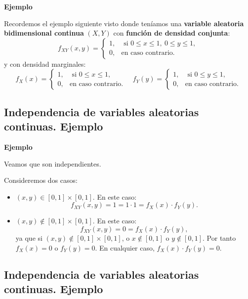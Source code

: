 \documentclass[]{book}
\begin{document}
\textbf{Ejemplo}

Recordemos el ejemplo siguiente visto donde teníamos una \textbf{variable aleatoria bidimensional continua} \((X,Y)\) con \textbf{función de densidad conjunta}:
\[
f_{XY}(x,y)=\begin{cases}
1, & \mbox{ si }0\leq x\leq 1,\ 0\leq y\leq 1, \\
0, & \mbox{en caso contrario.}
\end{cases}
\]
y con densidad marginales:
\[
f_{X}(x)=\begin{cases}
1, & \mbox{ si }0\leq x\leq 1,\\
0, & \mbox{en caso contrario.}
\end{cases}\quad f_{Y}(y)=\begin{cases}
1, & \mbox{ si }0\leq y\leq 1,\\
0, & \mbox{en caso contrario.}
\end{cases}
\]

\hypertarget{independencia-de-variables-aleatorias-continuas.-ejemplo-1}{%
\subsection{Independencia de variables aleatorias continuas. Ejemplo}\label{independencia-de-variables-aleatorias-continuas.-ejemplo-1}}

\textbf{Ejemplo}

Veamos que son independientes.

Consideremos dos casos:

\begin{itemize}
\item
  \((x,y)\in [0,1]\times [0,1]\). En este caso:
  \[
  f_{XY}(x,y) =1 =1\cdot 1=f_X(x)\cdot f_Y(y).
  \]
\item
  \((x,y)\not\in [0,1]\times [0,1]\). En este caso:
  \[
  f_{XY}(x,y) =0 = f_X(x)\cdot f_Y(y),
  \]
  ya que si \((x,y)\not\in [0,1]\times [0,1]\), o \(x\not\in [0,1]\) o \(y\not\in [0,1]\). Por tanto \(f_X(x)=0\) o \(f_Y(y)=0\). En cualquier caso, \(f_X(x)\cdot f_Y(y)=0\).
\end{itemize}

\hypertarget{independencia-de-variables-aleatorias-continuas.-ejemplo-2}{%
\subsection{Independencia de variables aleatorias continuas. Ejemplo}\label{independencia-de-variables-aleatorias-continuas.-ejemplo-2}}
\end{document}
